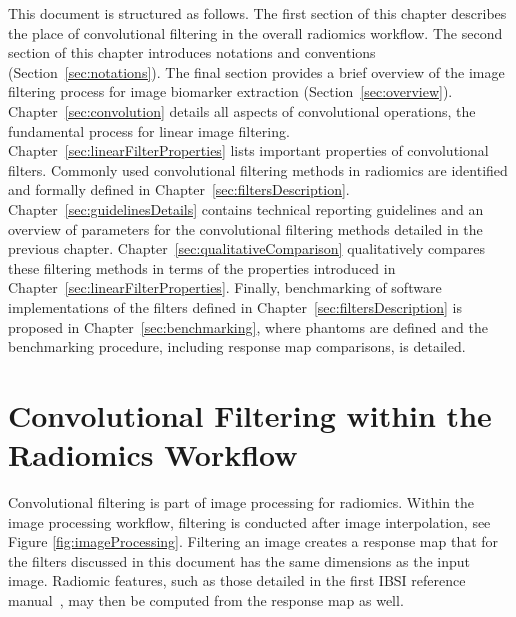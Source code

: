 \documentclass[fleqn,a4paper,oneside,openany]{book}
\renewcommand{\marginnote}[2][]{}
\begin{document}
This document is structured as follows.
The first section of this chapter describes the place of convolutional filtering in the overall radiomics workflow.
The second section of this chapter introduces notations and conventions (Section~\ref{sec:notations}).
The final section provides a brief overview of the image filtering process for image biomarker extraction (Section~\ref{sec:overview}).
Chapter~\ref{sec:convolution} details all aspects of convolutional operations, the fundamental process for linear image filtering.
Chapter~\ref{sec:linearFilterProperties} lists important properties of convolutional filters.
Commonly used convolutional filtering methods in radiomics are identified and formally defined in Chapter~\ref{sec:filtersDescription}.
Chapter~\ref{sec:guidelinesDetails} contains technical reporting guidelines and an overview of parameters for the convolutional filtering methods detailed in the previous chapter.
Chapter~\ref{sec:qualitativeComparison} qualitatively compares these filtering methods in terms of the properties introduced in Chapter~\ref{sec:linearFilterProperties}.
Finally, benchmarking of software implementations of the filters defined in Chapter~\ref{sec:filtersDescription} is proposed in Chapter~\ref{sec:benchmarking}, where phantoms are defined and the benchmarking procedure, including response map comparisons, is detailed. 

\section{Convolutional Filtering within the Radiomics Workflow}\label{sec:overallWorkflow}
 \marginnote{\footnotesize v4: Moved embedding of convolutional filtering in radiomics workflow to section \ref{sec:overallWorkflow}.}
Convolutional filtering is part of image processing for radiomics. Within the image processing workflow, filtering is conducted after image interpolation, see Figure \ref{fig:imageProcessing}. Filtering an image creates a response map that for the filters discussed in this document has the same dimensions as the input image. Radiomic features, such as those detailed in the first IBSI reference manual~\cite{ZLV2017}, may then be computed from the response map as well.
\end{document}

